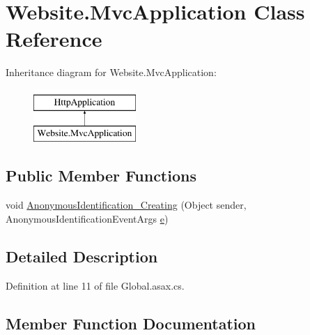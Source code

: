 \hypertarget{class_website_1_1_mvc_application}{}\section{Website.\+Mvc\+Application Class Reference}
\label{class_website_1_1_mvc_application}
Inheritance diagram for Website.\+Mvc\+Application\+:\begin{figure}[H]
\begin{center}
\leavevmode
\includegraphics[height=2.000000cm]{class_website_1_1_mvc_application}
\end{center}
\end{figure}
\subsection*{Public Member Functions}
\begin{DoxyCompactItemize}
\item 
void \hyperlink{class_website_1_1_mvc_application_ae7ad6f1eeb17b9637bf4c8097d5d19b2}{Anonymous\+Identification\+\_\+\+Creating} (Object sender, Anonymous\+Identification\+Event\+Args \hyperlink{jquery_8unobtrusive-ajax_8min_8js_a1bbdb559c9d41205c42f84b233650eb3}{e})
\end{DoxyCompactItemize}


\subsection{Detailed Description}


Definition at line 11 of file Global.\+asax.\+cs.



\subsection{Member Function Documentation}
\hypertarget{class_website_1_1_mvc_application_ae7ad6f1eeb17b9637bf4c8097d5d19b2}{}
